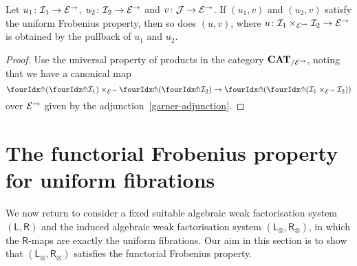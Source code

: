 \documentclass[reqno,10pt,a4paper,oneside,draft]{amsart}
\newcommand{\LL}{\mathsf{L}}
\newcommand{\RR}{\mathsf{R}}
\begin{document}
{{\begin{proposition} \label{uniform-frobenius-product-u} Let $u_1 \co \cal{I}_1 \to \cal{E}^\to$, $u_2 \co \cal{I}_2 \to \cal{E}^\to$ and
$v \co \cal{J} \to \cal{E}^\to$. If $(u_1, v)$ and $(u_2, v)$ satisfy the uniform Frobenius property, then so does $(u, v)$, where 
$u \co \cal{I}_1 \times_{\cal{E}^\to} \cal{I}_2 \to \cal{E}^\to$ is obtained by the pullback of $u_1$ and $u_2$.
\end{proposition}

\begin{proof}
Use the universal property of products in the category $\CAT_{/\cal{E}^\to}$, noting that we have a canonical map
\[
\liftl{(\liftr{\cal{I}_1})} \times_{\cal{E}^\to} \liftl{(\liftr{\cal{I}_2})} \to \liftl{(\liftr{(\cal{I}_1 \times_{\cal{E}^\to} \cal{I}_2)})}
\]
over $\cal{E}^\to$ given by the adjunction~\eqref{garner-adjunction}.
\end{proof}




\newpage


\section{The functorial Frobenius property for uniform fibrations}
\label{sec:frocuf}


We now return to consider a fixed suitable algebraic weak factorisation system $(\LL, \RR)$ and the induced 
algebraic weak factorisation system $(\LL_\otimes, \RR_\otimes)$, in which the $\RR$-maps are exactly the
uniform fibrations. Our aim in this section is to show that $(\LL_\otimes, \RR_\otimes)$ satisfies the functorial
Frobenius property. 

}}
\end{document}
